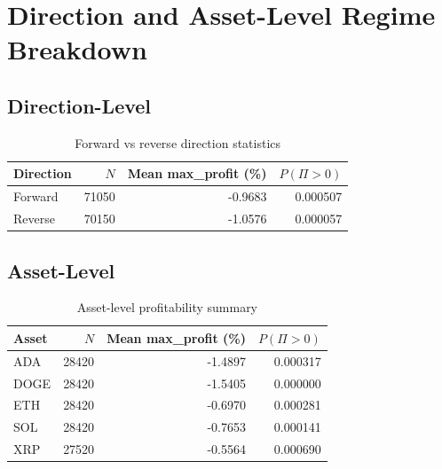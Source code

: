 \documentclass[11pt,a4paper]{article}
\begin{document}
\section{Direction and Asset-Level Regime Breakdown}
\subsection{Direction-Level}
\begin{table}[H]
\centering
\caption{Forward vs reverse direction statistics}
\begin{tabular}{l r r r}
\toprule
Direction & $N$ & Mean max\_profit (\%) & $P(\Pi>0)$ \\
\midrule
Forward & 71050 & -0.9683 & 0.000507 \\
Reverse & 70150 & -1.0576 & 0.000057 \\
\bottomrule
\end{tabular}
\end{table}

\subsection{Asset-Level}
\begin{table}[H]
\centering
\caption{Asset-level profitability summary}
\begin{tabular}{l r r r}
\toprule
Asset & $N$ & Mean max\_profit (\%) & $P(\Pi>0)$ \\
\midrule
ADA & 28420 & -1.4897 & 0.000317 \\
DOGE & 28420 & -1.5405 & 0.000000 \\
ETH & 28420 & -0.6970 & 0.000281 \\
SOL & 28420 & -0.7653 & 0.000141 \\
XRP & 27520 & -0.5564 & 0.000690 \\
\bottomrule
\end{tabular}
\end{table}
\end{document}

